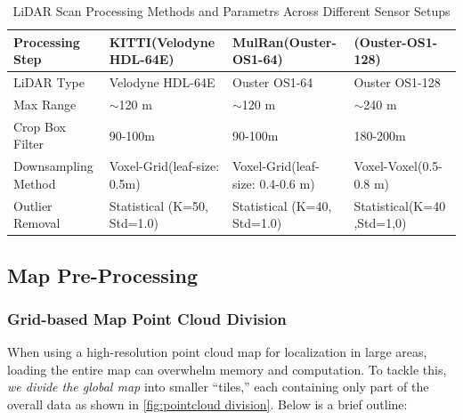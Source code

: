 \begin{table}[htbp]
\centering
\caption{LiDAR Scan Processing Methods and Parametrs  Across Different Sensor Setups}
\label{tab:lidar_preprocessing}
\begin{tabular}{|p{3.5cm}|p{3.5cm}|p{3.5cm}|p{3.5cm}|}
\hline
\textbf{Processing Step} & \textbf{KITTI(Velodyne HDL-64E)} & \textbf{MulRan(Ouster-OS1-64)} & \textbf{(Ouster-OS1-128)} \\
\hline
LiDAR Type & Velodyne HDL-64E & Ouster OS1-64 & Ouster OS1-128 \\
\hline
Max Range & $\sim$120 m & $\sim$120 m & $\sim$240 m \\
\hline
Crop Box Filter & 90-100m & 90-100m & 180-200m\\
\hline
Downsampling Method & Voxel-Grid(leaf-size: 0.5m) & Voxel-Grid(leaf-size: 0.4-0.6 m) & Voxel-Voxel(0.5-0.8 m) \\
\hline
Outlier Removal & Statistical (K=50, Std=1.0) & Statistical (K=40, Std=1.0) & Statistical(K=40 ,Std=1,0) \\
\hline
\end{tabular}
\end{table}

\subsection{Map Pre-Processing}

\subsubsection{Grid-based Map Point Cloud Division }

When using a high-resolution point cloud map for localization in large areas, loading the entire map can overwhelm memory and computation. To tackle this, \emph{we divide the global map} into smaller ``tiles,'' each containing only part of the overall data as shown in \ref{fig:pointcloud division}. Below is a brief outline:

